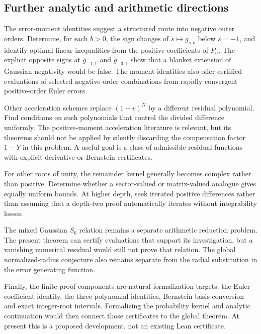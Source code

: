 \subsection{Further analytic and arithmetic directions}
The error-moment identities suggest a structured route into negative outer orders. Determine, for each $b>0$, the sign changes of $s\mapsto g_{s,b}$ below $s=-1$, and identify optimal linear inequalities from the positive coefficients of $P_n$. The explicit opposite signs at $g_{-1,1}$ and $g_{-3,1}$ show that a blanket extension of Gaussian negativity would be false. The moment identities also offer certified evaluations of selected negative-order combinations from rapidly convergent positive-order Euler errors.

Other acceleration schemes replace $(1-v)^N$ by a different residual polynomial. Find conditions on such polynomials that control the divided difference uniformly. The positive-moment acceleration literature is relevant, but its theorems should not be applied by silently discarding the compensation factor $1-Y$ in this problem. A useful goal is a class of admissible residual functions with explicit derivative or Bernstein certificates.

For other roots of unity, the remainder kernel generally becomes complex rather than positive. Determine whether a sector-valued or matrix-valued analogue gives equally uniform bounds. At higher depth, seek iterated positive differences rather than assuming that a depth-two proof automatically iterates without integrability losses.

The mixed Gaussian $S_6$ relation remains a separate arithmetic reduction problem. The present theorem can certify evaluations that support its investigation, but a vanishing numerical residual would still not prove that relation. The global normalized-radius conjecture also remains separate from the radial substitution in the error generating function.

Finally, the finite proof components are natural formalization targets: the Euler coefficient identity, the three polynomial identities, Bernstein basis conversion and exact integer-root intervals. Formalizing the probability kernel and analytic continuation would then connect those certificates to the global theorem. At present this is a proposed development, not an existing Lean certificate.
